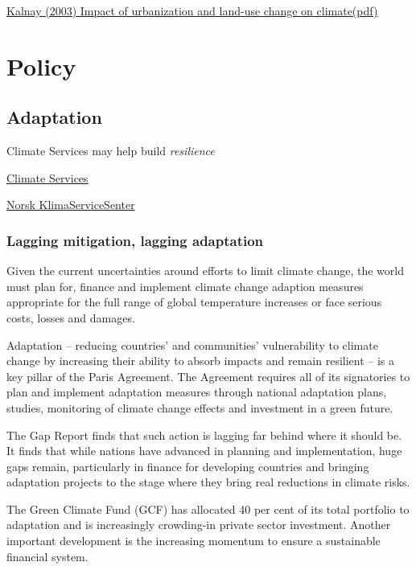 \documentclass[
]{book}
\begin{document}
\href{https://www.nature.com/articles/nature01675}{Kalnay (2003) Impact of urbanization and land-use change on climate}\href{pdf/Kalnay_2003_Impact_of_Urbanization_and_LUC_on_Climate.pdf}{(pdf)}

\hypertarget{part-policy}{%
\part{Policy}\label{part-policy}}

\hypertarget{adaptation}{%
\chapter{Adaptation}\label{adaptation}}

Climate Services may help build \emph{resilience}

\href{https://gfcs.wmo.int/}{Climate Services}

\href{https://klimaservicesenter.no/faces/desktop/index.xhtml}{Norsk KlimaServiceSenter}

\hypertarget{lagging-mitigation-lagging-adaptation}{%
\section{Lagging mitigation, lagging adaptation}\label{lagging-mitigation-lagging-adaptation}}

Given the current uncertainties around efforts to limit climate change,
the world must plan for, finance and implement climate change adaption measures
appropriate for the full range of global temperature increases or
face serious costs, losses and damages.

Adaptation -- reducing countries' and communities' vulnerability to climate change
by increasing their ability to absorb impacts and remain resilient --
is a key pillar of the Paris Agreement.
The Agreement requires all of its signatories to plan and implement adaptation measures
through national adaptation plans, studies, monitoring of climate change effects and
investment in a green future.

The Gap Report finds that such action is lagging far behind where it should be.
It finds that while nations have advanced in planning and implementation, huge gaps remain,
particularly in finance for developing countries and
bringing adaptation projects to the stage where they bring real reductions in climate risks.

The Green Climate Fund (GCF) has allocated 40 per
cent of its total portfolio to adaptation and is increasingly crowding-in private sector investment.
Another important development is the increasing momentum to ensure a sustainable financial
system.
\end{document}
